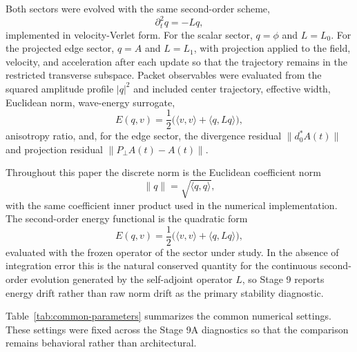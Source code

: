 \documentclass[11pt]{article}
\begin{document}
Both sectors were evolved with the same second-order scheme,
\begin{equation}
\partial_t^2 q = -L q,
\end{equation}
implemented in velocity-Verlet form. For the scalar sector, $q = \phi$ and $L=L_0$. For the projected edge sector, $q=A$ and $L=L_1$, with projection applied to the field, velocity, and acceleration after each update so that the trajectory remains in the restricted transverse subspace. Packet observables were evaluated from the squared amplitude profile $|q|^2$ and included center trajectory, effective width, Euclidean norm, wave-energy surrogate,
\begin{equation}
E(q,v) = \frac{1}{2}\big(\langle v,v\rangle + \langle q, L q\rangle\big),
\end{equation}
anisotropy ratio, and, for the edge sector, the divergence residual $\|d_0^{*}A(t)\|$ and projection residual $\|P_{\perp}A(t)-A(t)\|$.

Throughout this paper the discrete norm is the Euclidean coefficient norm
\begin{equation}
\|q\| = \sqrt{\langle q,q\rangle},
\end{equation}
with the same coefficient inner product used in the numerical implementation. The second-order energy functional is the quadratic form
\begin{equation}
E(q,v) = \frac{1}{2}\big(\langle v,v\rangle + \langle q, L q\rangle\big),
\end{equation}
evaluated with the frozen operator of the sector under study. In the absence of integration error this is the natural conserved quantity for the continuous second-order evolution generated by the self-adjoint operator $L$, so Stage 9 reports energy drift rather than raw norm drift as the primary stability diagnostic.

Table~\ref{tab:common-parameters} summarizes the common numerical settings. These settings were fixed across the Stage 9A diagnostics so that the comparison remains behavioral rather than architectural.
\end{document}
